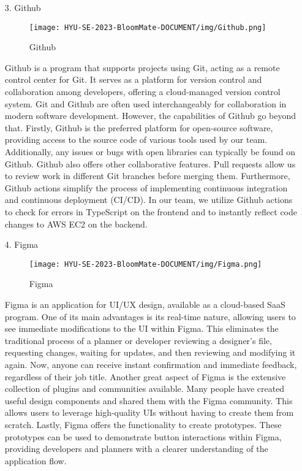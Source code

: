 \documentclass[conference, a4paper]{IEEEtran}
\begin{document}
\begin{enumerate}
    \item[3.]Github
    \begin{figure}[h]
    \centering
    \texttt{[image: HYU-SE-2023-BloomMate-DOCUMENT/img/Github.png]}
    \label{fig:Github}
    \caption{Github} 
    \end{figure}
    \item[]Github is a program that supports projects using Git, acting as a remote control center for Git. It serves as a platform for version control and collaboration among developers, offering a cloud-managed version control system. Git and Github are often used interchangeably for collaboration in modern software development. However, the capabilities of Github go beyond that. Firstly, Github is the preferred platform for open-source software, providing access to the source code of various tools used by our team. Additionally, any issues or bugs with open libraries can typically be found on Github. Github also offers other collaborative features. Pull requests allow us to review work in different Git branches before merging them. Furthermore, Github actions simplify the process of implementing continuous integration and continuous deployment (CI/CD). In our team, we utilize Github actions to check for errors in TypeScript on the frontend and to instantly reflect code changes to AWS EC2 on the backend.\\


    \item[4.]Figma
    \begin{figure}[h]
    \centering
    \texttt{[image: HYU-SE-2023-BloomMate-DOCUMENT/img/Figma.png]}
    \label{fig:Figma}
    \caption{Figma} 
    \end{figure}
    \item[]Figma is an application for UI/UX design, available as a cloud-based SaaS program. One of its main advantages is its real-time nature, allowing users to see immediate modifications to the UI within Figma. This eliminates the traditional process of a planner or developer reviewing a designer's file, requesting changes, waiting for updates, and then reviewing and modifying it again. Now, anyone can receive instant confirmation and immediate feedback, regardless of their job title. Another great aspect of Figma is the extensive collection of plugins and communities available. Many people have created useful design components and shared them with the Figma community. This allows users to leverage high-quality UIs without having to create them from scratch. Lastly, Figma offers the functionality to create prototypes. These prototypes can be used to demonstrate button interactions within Figma, providing developers and planners with a clearer understanding of the application flow.\\




\end{enumerate}
\end{document}
